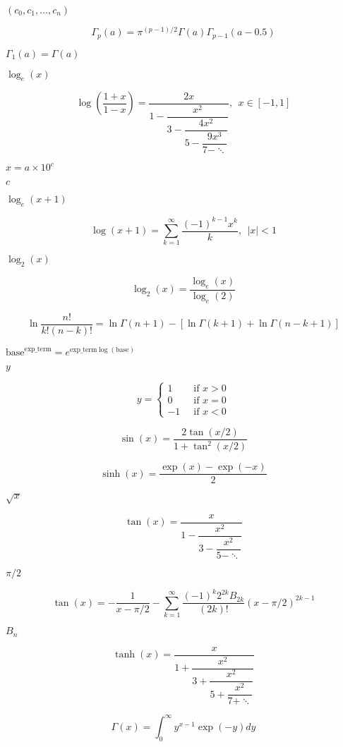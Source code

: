 \documentclass{article}
\begin{document}
$ (c_0, c_1, \ldots, c_n) $
\pagebreak

\[ \Gamma_p(a) = \pi^{(p-1)/2} \Gamma(a) \Gamma_{p-1}(a-0.5) \]
\pagebreak

$ \Gamma_1(a) = \Gamma(a) $
\pagebreak

$ \log_e(x) $
\pagebreak

\[ \log\left(\frac{1+x}{1-x}\right) = \dfrac{2x}{1-\dfrac{x^2}{3-\dfrac{4x^2}{5 - \dfrac{9x^3}{7 - \ddots}}}}, \ \ x \in [-1,1] \]
\pagebreak

$ x = a \times 10^c $
\pagebreak

$ c $
\pagebreak

$ \log_e(x+1) $
\pagebreak

\[ \log(x+1) = \sum_{k=1}^\infty \dfrac{(-1)^{k-1}x^k}{k}, \ \ |x| < 1 \]
\pagebreak

$ \log_2(x) $
\pagebreak

\[ \log_{2}(x) = \frac{\log_e(x)}{\log_e(2)} \]
\pagebreak

\[ \ln \frac{n!}{k!(n-k)!} = \ln \Gamma(n+1) - [ \ln \Gamma(k+1) + \ln \Gamma(n-k+1) ] \]
\pagebreak

$ \text{base}^{\text{exp\_term}} = e^{\text{exp\_term} \log(\text{base})} $
\pagebreak

$ y $
\pagebreak

\[ y = \begin{cases} 1 \ &\text{ if } x > 0 \\ 0 \ &\text{ if } x = 0 \\ -1 \ &\text{ if } x < 0 \end{cases} \]
\pagebreak

\[ \sin(x) = \frac{2\tan(x/2)}{1+\tan^2(x/2)} \]
\pagebreak

\[ \sinh(x) = \frac{\exp(x) - \exp(-x)}{2} \]
\pagebreak

$ \sqrt{x} $
\pagebreak

\[ \tan(x) = \dfrac{x}{1 - \dfrac{x^2}{3 - \dfrac{x^2}{5 - \ddots}}} \]
\pagebreak

$ \pi / 2 $
\pagebreak

\[ \tan(x) = - \frac{1}{x-\pi/2} - \sum_{k=1}^\infty \frac{(-1)^k 2^{2k} B_{2k}}{(2k)!} (x - \pi/2)^{2k - 1} \]
\pagebreak

$ B_n $
\pagebreak

\[ \tanh(x) = \dfrac{x}{1 + \dfrac{x^2}{3 + \dfrac{x^2}{5 + \dfrac{x^2}{7 + \ddots}}}} \]
\pagebreak

\[ \Gamma(x) = \int_0^\infty y^{x-1} \exp(-y) dy \]
\pagebreak
\end{document}
